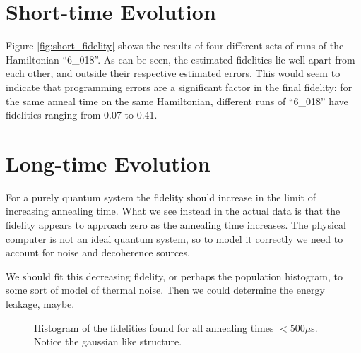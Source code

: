 \section{Short-time Evolution}
Figure \ref{fig:short_fidelity} shows the results of four different sets of runs of the Hamiltonian ``6\_018''.  As can be seen, the estimated fidelities lie well apart from each other, and outside their respective estimated errors.  This would seem to indicate that programming errors are a significant factor in the final fidelity: for the same anneal time on the same Hamiltonian, different runs of ``6\_018'' have fidelities ranging from 0.07 to 0.41.


\section{Long-time Evolution}
For a purely quantum system the fidelity should increase in the limit of increasing annealing time.  What we see instead in the actual data is that the fidelity appears to approach zero as the annealing time increases.  The physical computer is not an ideal quantum system, so to model it correctly we need to account for noise and decoherence sources.

We should fit this decreasing fidelity, or perhaps the population histogram, to some sort of model of thermal noise.  Then we could determine the energy leakage, maybe.




\begin{figure}
	\caption[Short Time Fidelity Histogram]{Histogram of the fidelities found for all annealing times  $< 500 \mu$s.  Notice the gaussian like structure.}
	\label{fig:fid_hist}
\end{figure}

